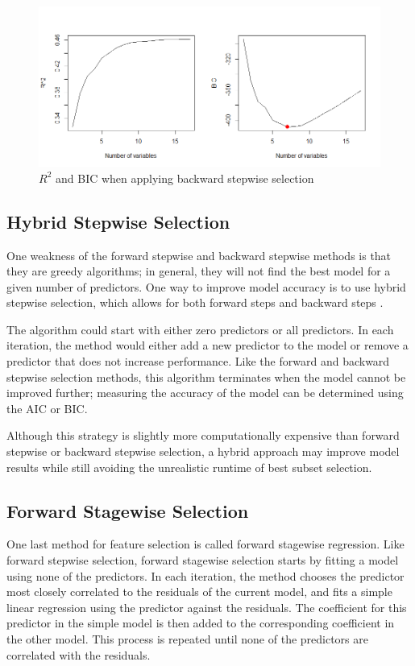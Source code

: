 \documentclass{article}
\begin{document}
\begin{figure}[!h]
	\centering
	\caption{$R^2$ and BIC when applying backward stepwise selection}
	\label{fig:backward-stepwise-selection}
	\includegraphics[width = 6in]{backward-stepwise-selection.png}
\end{figure}

\subsection{Hybrid Stepwise Selection}
One weakness of the forward stepwise and backward stepwise methods is that they are greedy algorithms; in general, they will not find the best model for a given number of predictors. One way to improve model accuracy is to use hybrid stepwise selection, which allows for both forward steps and backward steps \cite{friedman2001elements}.

The algorithm could start with either zero predictors or all predictors. In each iteration, the method would either add a new predictor to the model or remove a predictor that does not increase performance. Like the forward and backward stepwise selection methods, this algorithm terminates when the model cannot be improved further; measuring the accuracy of the model can be determined using the AIC or BIC.

Although this strategy is slightly more computationally expensive than forward stepwise or backward stepwise selection, a hybrid approach may improve model results while still avoiding the unrealistic runtime of best subset selection.

\subsection{Forward Stagewise Selection}
One last method for feature selection is called forward stagewise regression. Like forward stepwise selection, forward stagewise selection starts by fitting a model using none of the predictors. In each iteration, the method chooses the predictor most closely correlated to the residuals of the current model, and fits a simple linear regression using the predictor against the residuals. The coefficient for this predictor in the simple model is then added to the corresponding coefficient in the other model. This process is repeated until none of the predictors are correlated with the residuals.
\end{document}
